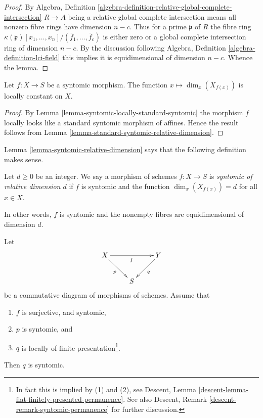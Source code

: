 \begin{proof}
By Algebra,
Definition \ref{algebra-definition-relative-global-complete-intersection}
$R \to A$ being a relative global complete intersection means
all nonzero fibre rings have dimension $n - c$.
Thus for a prime $\mathfrak p$ of $R$ the fibre ring 
$\kappa(\mathfrak p)[x_1, \ldots, x_n]/(\overline{f}_1, \ldots, \overline{f}_c)$
is either zero or a global complete intersection ring of dimension $n - c$.
By the discussion following
Algebra, Definition \ref{algebra-definition-lci-field}
this implies it is equidimensional of dimension $n - c$.
Whence the lemma.
\end{proof}

\begin{lemma}
\label{lemma-syntomic-relative-dimension}
Let $f : X \to S$ be a syntomic morphism. The function
$x \mapsto \dim_x(X_{f(x)})$ is locally constant on $X$.
\end{lemma}

\begin{proof}
By Lemma \ref{lemma-syntomic-locally-standard-syntomic}
the morphism $f$ locally looks like a standard
syntomic morphism of affines. Hence the result follows
from Lemma \ref{lemma-standard-syntomic-relative-dimension}.
\end{proof}

\noindent
Lemma \ref{lemma-syntomic-relative-dimension}
says that the following definition makes sense.

\begin{definition}
\label{definition-syntomic-relative-dimension}
Let $d \geq 0$ be an integer. We say a morphism of schemes $f : X \to S$
is {\it syntomic of relative dimension $d$} if $f$ is syntomic and
the function $\dim_x(X_{f(x)}) = d$ for all $x \in X$.
\end{definition}

\noindent
In other words, $f$ is syntomic and the nonempty fibres are equidimensional
of dimension $d$.

\begin{lemma}
\label{lemma-syntomic-permanence}
Let
$$
\xymatrix{
X \ar[rr]_f \ar[rd]_p & &
Y \ar[dl]^q \\
& S
}
$$
be a commutative diagram of morphisms of schemes. Assume that
\begin{enumerate}
\item $f$ is surjective, and syntomic,
\item $p$ is syntomic, and
\item $q$ is locally of finite presentation\footnote{In fact this
is implied by (1) and (2), see
Descent, Lemma \ref{descent-lemma-flat-finitely-presented-permanence}.
See also
Descent, Remark \ref{descent-remark-syntomic-permanence}
for further discussion.}.
\end{enumerate}
Then $q$ is syntomic.
\end{lemma}


